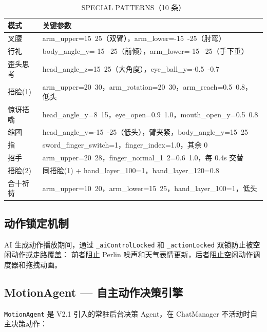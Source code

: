 \documentclass[12pt,a4paper]{ctexart}
\begin{document}
\begin{table}[H]
\centering
\caption{SPECIAL PATTERNS（10 条）}
\label{tab:special-patterns}
\begin{tabular}{ll}
\toprule
\textbf{模式} & \textbf{关键参数} \\
\midrule
叉腰 & arm\_upper=15~25（双臂），arm\_lower=-15~-25（肘弯） \\
行礼 & body\_angle\_y=-15~-25（前倾），arm\_lower=-15~-25（手下垂） \\
歪头思考 & head\_angle\_z=15~25（大角度），eye\_ball\_y=-0.5~-0.7 \\
捂脸(1) & arm\_upper=20~30，arm\_rotation=20~30，arm\_reach=0.5~0.8，低头 \\
惊讶捂嘴 & head\_angle\_y=8~15，eye\_open=0.9~1.0，mouth\_open\_y=0.5~0.8 \\
缩团 & head\_angle\_y=-15~-25（低头），臂夹紧，body\_angle\_y=15~25 \\
指 & sword\_finger\_switch=1，finger\_index=1.0，其余 0 \\
招手 & arm\_upper=20~28，finger\_normal\_1~2=0.6~1.0，每 0.4s 交替 \\
捂脸(2) & 同捂脸(1) + hand\_layer\_100=1，hand\_layer\_120=0.8 \\
合十祈祷 & arm\_upper=10~20，arm\_lower=15~25，hand\_layer\_100=1，低头 \\
\bottomrule
\end{tabular}
\end{table}

\subsection{动作锁定机制}

AI 生成动作播放期间，通过 \texttt{\_aiControlLocked} 和 \texttt{\_actionLocked} 双锁防止被空闲动作或走路覆盖：
前者阻止 Perlin 噪声和天气表情更新，后者阻止空闲动作调度器和拖拽动画。

\subsection{MotionAgent --- 自主动作决策引擎}

\texttt{MotionAgent} 是 V2.1 引入的常驻后台决策 Agent，在 ChatManager 不活动时自主决策动作：
\end{document}
